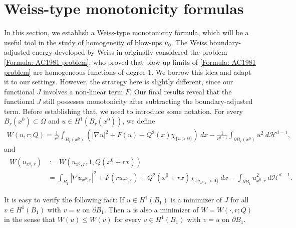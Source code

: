 \documentclass[11pt,reqno]{amsart}
\begin{document}
\section{Weiss-type monotonicity formulas}\label{Section: Weiss-type monotonicity formula}In this section, we establish a Weiss-type monotonicity formula, which will be a useful tool in the study of homogeneity of blow-ups $u_{0}$. The Weiss boundary-adjusted energy developed by Weiss in \cite{W1999} originally considered the problem \eqref{Formula: AC1981 problem}, who proved that blow-up limits of \eqref{Formula: AC1981 problem} are homogeneous functions of degree $1$. We borrow this idea and adapt it to our settings. However, the strategy here is slightly different, since our functional $J$ involves a non-linear term $F$. Our final results reveal that the functional $J$ still possesses monotonicity after subtracting the boundary-adjusted term. Before establishing that, we need to introduce some notation.
For every $B_{r}(x^{0})\subset\Omega$ and $u\in H^{1}(B_{r}(x^{0}))$, we define
\begin{align}\label{Formula: M(1)}
	W(u,r;Q)=\frac{1}{r^{d}}\int_{B_{r}(x^{0})}(|\nabla u|^{2}+F(u)+Q^{2}(x)\chi_{\{u>0\}})\:dx-\frac{1}{r^{d+1}}\int_{\partial B_{r}(x^{0})}u^{2}\:d\mathcal{H}^{d-1},
\end{align}
and 
\begin{align}\label{Formula: M(1')}
	\begin{alignedat}{2}
		W(u_{x^{0},r})&:=W(u_{x^{0},r},1,Q(x^{0}+rx))\\
		&=\int_{B_{1}}|\nabla u_{x^{0},r}|^{2}+F(ru_{x^{0},r})+Q^{2}(x^{0}+rx)\chi_{\{u_{x^{0},r}>0\}}\:dx-\int_{\partial B_{1}}u_{x^{0},r}^{2}\:d\mathcal{H}^{d-1}.
	\end{alignedat}
\end{align}
\begin{remark}\label{Remark: Minimality of Weiss energy}
	It is easy to verify the following fact: If $u\in H^{1}(B_{1})$ is a minimizer of $J$ for all $v\in H^{1}(B_{1})$ with $v=u$ on $\partial B_{1}$. Then $u$ is also a minimizer of $W=W(\cdot,r;Q)$ in the sense that $W(u)\leqslant W(v)$ for every $v\in H^{1}(B_{1})$ with $v=u$ on $\partial B_{1}$.
\end{remark}
\end{document}
